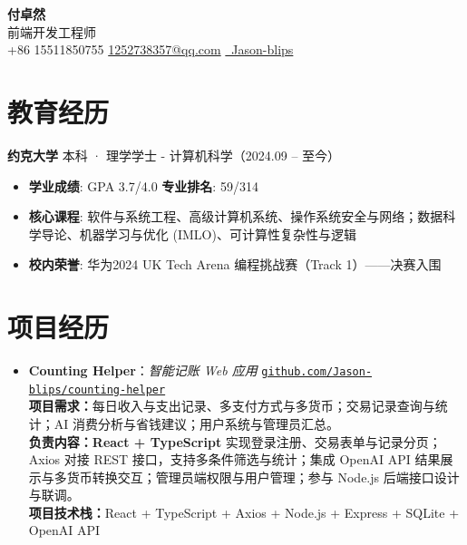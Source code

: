 \documentclass[a4paper]{article}
\begin{document}
\begin{center}
    \Huge \textbf{付卓然} \\[0.3cm]
    \normalsize 前端开发工程师 \\
    \small +86 15511850755 \quad \href{mailto:1252738357@qq.com}{1252738357@qq.com} \quad \href{https://github.com/Jason-blips}{\color{githubblue}\faGithub\ Jason-blips}
\end{center}
\vspace{-0.3cm}

\section{教育经历}
\textbf{约克大学} \hfill 本科 · 理学学士 - 计算机科学（2024.09 -- 至今）
\begin{itemize}
    \item \textbf{学业成绩}: GPA 3.7/4.0 \hfill \textbf{专业排名}: 59/314
    \item \textbf{核心课程}: 软件与系统工程、高级计算机系统、操作系统安全与网络；数据科学导论、机器学习与优化 (IMLO)、可计算性复杂性与逻辑
    \item \textbf{校内荣誉}: 华为2024 UK Tech Arena 编程挑战赛（Track 1）——决赛入围
\end{itemize}
\vspace{0.2cm}

\section{项目经历}

\begin{itemize}[leftmargin=0pt, itemsep=8pt, label={}]
\item
  \textbf{Counting Helper}：\textit{智能记账 Web 应用}
  \hfill \href{https://github.com/Jason-blips/counting-helper}{\texttt{github.com/Jason-blips/counting-helper}}\\[2pt]
  \textbf{项目需求：}每日收入与支出记录、多支付方式与多货币；交易记录查询与统计；AI 消费分析与省钱建议；用户系统与管理员汇总。\\
  \textbf{负责内容：}\textbf{React + TypeScript} 实现登录注册、交易表单与记录分页；Axios 对接 REST 接口，支持多条件筛选与统计；集成 OpenAI API 结果展示与多货币转换交互；管理员端权限与用户管理；参与 Node.js 后端接口设计与联调。\\
  \textbf{项目技术栈：}React \;+\; TypeScript \;+\; Axios \;+\; Node.js \;+\; Express \;+\; SQLite \;+\; OpenAI API
\end{itemize}
\vspace{0.2cm}
\end{document}

